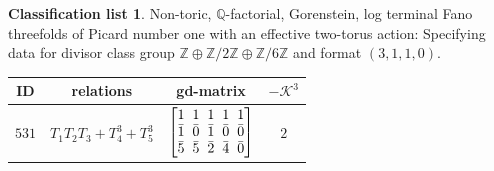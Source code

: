 \documentclass[10pt,a4paper]{amsart}
\theoremstyle{definition}
\newtheorem{class-list}[thm]{Classification list}
\def\ZZ{{\mathbb Z}}
\def\QQ{{\mathbb Q}}
\numberwithin{equation}{section}
\begin{document}
\begin{class-list}\label{class-list(0,2,6)}
Non-toric, $\QQ$-factorial, Gorenstein, log terminal Fano
threefolds of Picard number one with an effective two-torus action:
Specifying data for divisor class group
$\ZZ\oplus \ZZ/2\ZZ\oplus \ZZ/6\ZZ$ and format $(3,1,1,0)$.
\begin{table}[h!]\centering\setlength{\tabcolsep}{5.5pt}
\renewcommand{\arraystretch}{1.1}\small\tabulinesep=1mm
\begin{tabu}{c|c|c|c}
\hline
ID&relations&gd-matrix&$-\mathcal{K}^3$
\\
\hline
${531}$&${T_{1}T_{2}T_{3}+T_{4}^{3}+T_{5}^{3}}$
&$\arraycolsep=1mm\begin{bmatrix}{1} & {1} & {1} & {1} & {1} \\ {\bar{1}} & {\bar{0}} & {\bar{1}} & {\bar{0}} & {\bar{0}} \\ {\bar{5}} & {\bar{5}} & {\bar{2}} & {\bar{4}} & {\bar{0}}\end{bmatrix}$
&${2}$
\\
\hline
\end{tabu}%
\end{table}
\end{class-list}
\end{document}
